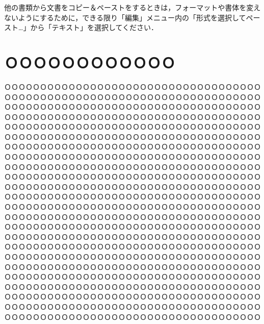 \documentclass[10pt,twocolumn]{jarticle}
\begin{document}
他の書類から文書をコピー＆ペーストをするときは，フォーマットや書体を変えないようにするために，できる限り「編集」メニュー内の「形式を選択してペースト…」から「テキスト」を選択してください．

\section{ＯＯＯＯＯＯＯＯＯＯＯＯ}
ＯＯＯＯＯＯＯＯＯＯＯＯＯＯＯＯＯＯＯＯＯＯＯＯＯＯＯＯＯＯＯＯＯＯＯＯＯＯＯＯＯＯＯＯＯＯＯＯＯＯＯＯＯＯＯＯＯＯＯＯＯＯＯＯＯＯＯＯＯＯＯＯＯＯＯＯＯＯＯＯＯＯＯＯＯＯＯＯＯＯＯＯＯＯＯＯＯＯＯＯＯＯＯＯＯＯＯＯＯＯＯＯＯＯＯＯＯＯＯＯＯＯＯＯＯＯＯＯＯＯＯＯＯＯＯＯＯＯＯＯＯＯＯＯＯＯＯＯＯＯＯＯＯＯＯＯＯＯＯＯＯＯＯＯＯＯＯＯＯＯＯＯＯＯＯＯＯＯＯＯＯＯＯＯＯＯＯＯＯＯＯＯＯＯＯＯＯＯＯＯＯＯＯＯＯＯＯＯＯＯＯＯＯＯＯＯＯＯＯＯＯＯＯＯＯＯＯＯＯＯＯＯＯＯＯＯＯＯＯＯＯＯＯＯＯＯＯＯＯＯＯＯＯＯＯＯＯＯＯＯＯＯＯＯＯＯＯＯＯＯＯＯＯＯＯＯＯＯＯＯＯＯＯＯＯＯＯＯＯＯＯＯＯＯＯＯＯＯＯＯＯＯＯＯＯＯＯＯＯＯＯＯＯＯＯＯＯＯＯＯＯＯＯＯＯＯＯＯＯＯＯＯＯＯＯＯＯＯＯＯＯＯＯＯＯＯＯＯＯＯＯＯＯＯＯＯＯＯＯＯＯＯＯＯＯＯＯＯＯＯＯＯＯＯＯＯＯＯＯＯＯＯＯＯＯＯＯＯＯＯＯＯＯＯＯＯＯＯＯＯＯＯＯＯＯＯＯＯＯＯＯＯＯＯＯＯＯＯＯＯＯＯＯＯＯＯＯＯＯＯＯＯＯＯＯＯＯＯＯＯＯＯＯＯＯＯＯＯＯＯＯＯＯＯＯＯＯＯＯＯＯＯＯＯＯＯＯＯＯＯＯＯＯＯＯＯＯＯＯＯＯＯＯＯＯＯＯＯＯＯＯＯＯＯＯＯＯＯＯＯＯＯＯＯＯＯＯＯＯＯＯＯＯＯＯＯＯＯＯＯＯＯＯＯＯＯＯＯＯＯＯＯＯＯＯＯＯＯＯＯＯＯＯＯＯＯＯＯＯＯＯＯＯＯＯＯＯＯＯＯＯＯＯＯＯＯＯＯＯＯＯＯＯＯＯＯＯＯＯＯＯＯＯＯＯＯＯＯＯＯＯＯＯＯＯＯＯＯＯＯＯＯＯＯＯＯＯＯＯＯＯＯＯＯＯＯＯＯＯＯＯＯＯＯＯＯＯＯＯＯＯＯＯＯＯＯＯＯＯＯＯＯＯＯＯＯＯＯＯＯＯＯＯＯＯＯＯＯＯＯＯＯＯＯＯＯＯＯＯＯＯＯＯＯＯＯＯＯＯＯＯＯＯＯＯＯＯＯＯＯＯＯＯＯＯＯＯＯＯＯＯＯＯＯＯＯＯＯＯＯＯＯＯＯＯＯＯＯＯＯＯＯＯＯＯＯＯＯＯＯＯＯＯＯＯＯＯＯＯＯＯＯＯＯＯＯＯＯＯＯＯＯＯＯＯＯＯＯＯＯＯＯＯＯＯＯＯＯＯＯＯＯＯＯＯＯＯＯＯＯＯＯＯＯＯＯＯＯＯＯＯＯＯＯＯＯＯＯＯＯＯＯＯＯＯＯＯＯＯＯＯＯＯＯＯＯＯＯＯＯＯＯＯＯＯＯＯＯＯＯＯＯＯＯＯＯＯＯＯＯＯＯＯＯＯＯＯＯＯＯＯＯＯＯＯＯＯＯＯＯＯＯＯＯ
\end{document}
